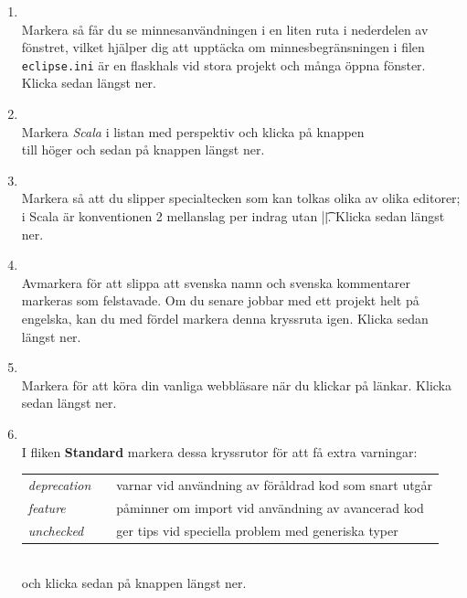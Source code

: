 \begin{enumerate}
\item \EclipsePrefsGeneral 
\\ Markera  så får du se minnesanvändningen i en liten ruta i nederdelen av fönstret, vilket hjälper dig att upptäcka om minnesbegränsningen i filen \texttt{eclipse.ini} är en flaskhals vid stora projekt och många öppna fönster. Klicka sedan  längst ner.

\item \EclipsePrefsGeneral{}  
\\ Markera \textit{Scala} i listan med perspektiv och klicka på knappen 
 \\  till höger och sedan på knappen  längst ner.

\item \EclipsePrefsGeneral{}
\\ Markera  så att du slipper specialtecken som kan tolkas olika av olika editorer; i Scala är konventionen 2 mellanslag per indrag utan \code|\t|. Klicka sedan  längst ner.

\item \EclipsePrefsGeneral{}
\\  Avmarkera  för att slippa att svenska namn och svenska kommentarer markeras som felstavade. Om du senare jobbar med ett projekt helt på engelska, kan du med fördel markera denna kryssruta igen. Klicka sedan  längst ner.

\item \EclipsePrefsGeneral{}
\\ Markera  för att köra din vanliga webbläsare när du klickar på länkar. Klicka sedan  längst ner.
  
\item  \EclipsePrefs{}
\\ I fliken \textbf{Standard} markera dessa kryssrutor för att få extra varningar: \\
\begin{tabular}{l @{}l @{}l}
\textit{deprecation} & \FramedCheckmark{} & varnar vid användning av föråldrad kod som snart utgår \\
\textit{feature}     & \FramedCheckmark{} & påminner om import vid användning av avancerad kod  \\
\textit{unchecked}   & \FramedCheckmark{} & ger tips vid speciella problem med generiska typer \\
\end{tabular}\\
och klicka sedan på knappen  längst ner.


\end{enumerate}
